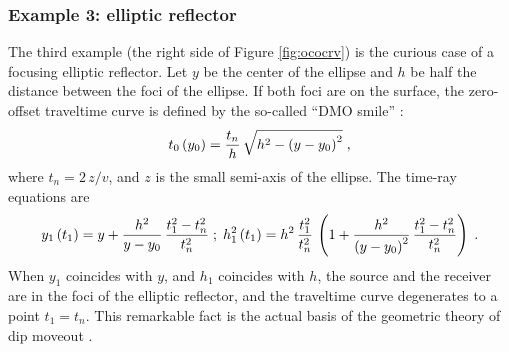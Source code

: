
\subsubsection{Example 3: elliptic reflector}

The third example (the right side of Figure \ref{fig:ococrv}) is the
curious case of a focusing elliptic reflector. Let $y$ be the center
of the ellipse and $h$ be half the distance between the foci of the
ellipse. If both foci are on the surface, the zero-offset
traveltime curve is defined by the so-called ``DMO smile''
\cite[]{GPR29-03-03740406}:
\begin{equation}
t_0\left(y_0\right)={t_n \over h}\,\sqrt{h^2-\left(y-y_0\right)^2}\;,
\label{eqn:smilezott}
\end{equation} 
where $t_n=2\,z/v$, and $z$ is the small semi-axis of the ellipse.
The time-ray equations are
\begin{equation}
y_1\left(t_1\right)=y+{h^2\over {y-y_0}}\,{{t_1^2-t_n^2} \over t_n^2}\;;\;
h_1^2\left(t_1\right)=h^2\,{t_1^2 \over t_n^2}\,
\left(1+
{h^2\over \left(y-y_0\right)^2}\,{{t_1^2-t_n^2} \over t_n^2}
\right)\;.
\label{eqn:smilerays}
\end{equation}
When $y_1$ coincides with $y$, and $h_1$ coincides with $h$, the
source and the receiver are in the foci of the elliptic reflector, and
the traveltime curve degenerates to a point $t_1=t_n$. This remarkable
fact is the actual basis of the geometric theory of dip moveout
\cite[]{GPR29-03-03740406}.

